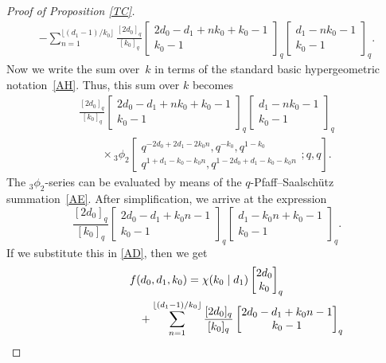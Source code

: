 \documentclass[10pt,a4paper]{amsart}
\def\fl#1{\lfloor#1\rfloor}
\begin{document}
\begin{proof}[Proof of Proposition \ref{TC}]
\begin{gather}
-\sum_{n=1}^{\fl{(d_1-1)/k_0}}
\frac {[2d_0]_q} {[k_0]_q}
\begin{bmatrix} 2d_0-d_1+nk_0+k_0-1\\k_0-1\end{bmatrix}_q
\begin{bmatrix} d_1-nk_0-1\\
k_0-1\end{bmatrix}_q.
\label{AD}
\end{gather}
Now we write the sum over~$k$
in terms of the standard basic hypergeometric notation~\eqref{AH}.
Thus, this sum over $k$ becomes
\begin{gather*}
\frac {[2d_0]_q} {[k_0]_q}
\begin{bmatrix} 2d_0-d_1+nk_0+k_0-1\\k_0-1\end{bmatrix}_q
\begin{bmatrix} d_1-nk_0-1\\
k_0-1\end{bmatrix}_q
\\ \qquad{}\times
   {}_3\phi _2 \!\left[\begin{matrix} q^{-2 d_0 + 2 d_1 - 2 k_0 n},
q^{-k_0},q^{1-k_0}\\
q^{1 + d_1 - k_0 - k_0 n},q^{1 - 2 d_0 + d_1 - k_0 - k_0 n}
\end{matrix} ;q,q\right].
\end{gather*}
The $_3\phi_2$-series can be evaluated by means of the
$q$-Pfaff--Saalsch\"utz summation~\eqref{AE}.
After simpli\-fi\-ca\-tion, we arrive at the expression
\begin{equation*}
\frac {[2d_0]_q} {[k_0]_q}
\begin{bmatrix} 2d_0-d_1+k_0n-1\\k_0-1\end{bmatrix}_q
\begin{bmatrix} d_1-k_0n+k_0-1\\k_0-1\end{bmatrix}_q.
\end{equation*}
If we substitute this in \eqref{AD}, then we get
\begin{gather*}
f(d_0,d_1,k_0)=
\chi(k_0\mid d_1)\begin{bmatrix} 2d_0\\k_0\end{bmatrix}_q\\ \hphantom{f(d_0,d_1,k_0)=}{}
+\sum_{n=1}^{\fl{(d_1-1)/k_0}}
\frac {[2d_0]_q} {[k_0]_q}
\begin{bmatrix} 2d_0-d_1+k_0n-1\\k_0-1\end{bmatrix}_q

\end{gather*}
\end{proof}
\end{document}
